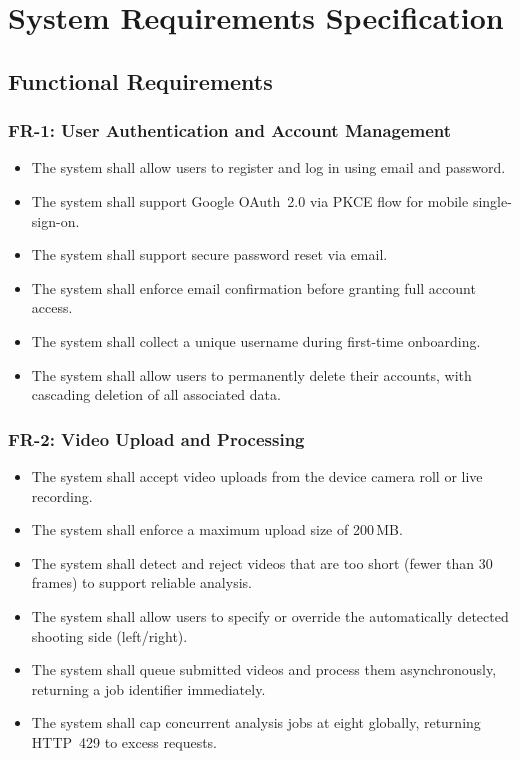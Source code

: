 \chapter{System Requirements Specification}
\label{chap:srs}

\section{Functional Requirements}
\label{sec:functional_requirements}

\subsection{FR-1: User Authentication and Account Management}

\begin{itemize}
  \item The system shall allow users to register and log in using email and password.
  \item The system shall support Google OAuth~2.0 via PKCE flow for mobile single-sign-on.
  \item The system shall support secure password reset via email.
  \item The system shall enforce email confirmation before granting full account access.
  \item The system shall collect a unique username during first-time onboarding.
  \item The system shall allow users to permanently delete their accounts, with cascading deletion of all associated data.
\end{itemize}

\subsection{FR-2: Video Upload and Processing}

\begin{itemize}
  \item The system shall accept video uploads from the device camera roll or live recording.
  \item The system shall enforce a maximum upload size of 200\,MB.
  \item The system shall detect and reject videos that are too short (fewer than 30 frames) to support reliable analysis.
  \item The system shall allow users to specify or override the automatically detected shooting side (left/right).
  \item The system shall queue submitted videos and process them asynchronously, returning a job identifier immediately.
  \item The system shall cap concurrent analysis jobs at eight globally, returning HTTP~429 to excess requests.
\end{itemize}

